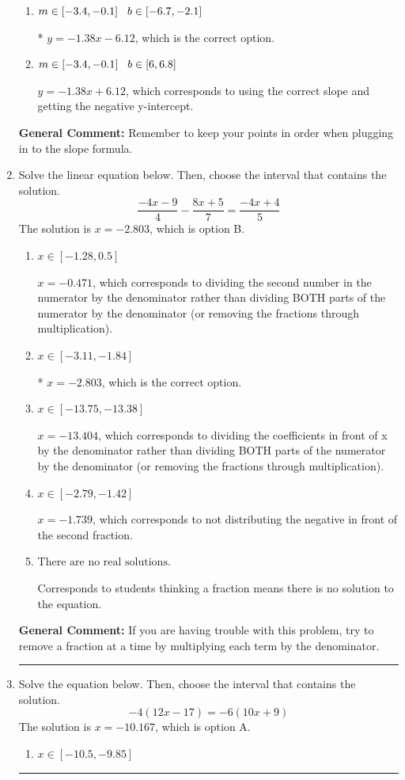 \documentclass{extbook}[14pt]
\newcommand{\litem}[1]{\item #1

\rule{\textwidth}{0.4pt}}
\begin{document}
\begin{enumerate}
{\begin{enumerate}[label=\Alph*.]
 $y = -1.38x + 20$, which corresponds to using the correct slope/equation but not distributing correctly using the first point.
\item \( m \in [-3.4, -0.1] \hspace*{3mm} b \in [-6.7, -2.1] \)

* $y = -1.38x -6.12$, which is the correct option.
\item \( m \in [-3.4, -0.1] \hspace*{3mm} b \in [6, 6.8] \)

 $y = -1.38x + 6.12$, which corresponds to using the correct slope and getting the negative y-intercept.
\end{enumerate}

\textbf{General Comment:} Remember to keep your points in order when plugging in to the slope formula.
}
\litem{
Solve the linear equation below. Then, choose the interval that contains the solution.
\[ \frac{-4x -9}{4} - \frac{8x + 5}{7} = \frac{-4x + 4}{5} \]
The solution is \( x = -2.803 \), which is option B.\begin{enumerate}[label=\Alph*.]
\item \( x \in [-1.28, 0.5] \)

 $x = -0.471$, which corresponds to dividing the second number in the numerator by the denominator rather than dividing BOTH parts of the numerator by the denominator (or removing the fractions through multiplication).
\item \( x \in [-3.11, -1.84] \)

* $x = -2.803$, which is the correct option.
\item \( x \in [-13.75, -13.38] \)

 $x = -13.404$, which corresponds to dividing the coefficients in front of x by the denominator rather than dividing BOTH parts of the numerator by the denominator (or removing the fractions through multiplication).
\item \( x \in [-2.79, -1.42] \)

 $x = -1.739$, which corresponds to not distributing the negative in front of the second fraction.
\item \( \text{There are no real solutions.} \)

Corresponds to students thinking a fraction means there is no solution to the equation.
\end{enumerate}

\textbf{General Comment:} If you are having trouble with this problem, try to remove a fraction at a time by multiplying each term by the denominator.
}
\litem{
Solve the equation below. Then, choose the interval that contains the solution.
\[ -4(12x -17) = -6(10x + 9) \]
The solution is \( x = -10.167 \), which is option A.\begin{enumerate}[label=\Alph*.]
\item \( x \in [-10.5, -9.85] \)


\end{enumerate}}
\end{enumerate}
\end{document}
